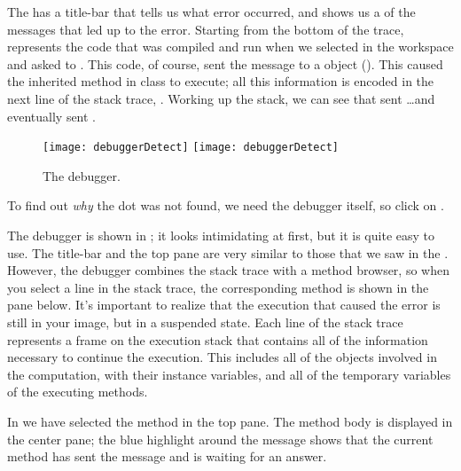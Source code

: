 \documentclass[a4paper,10pt,twoside]{book}
\begin{document}
The  has a title-bar that tells us what error occurred, and shows us a  of the messages that led up to the error. 
Starting from the bottom of the trace,  represents the code that was compiled and run when we selected  in the workspace and asked \sq to .
This code, of course, sent the message  to a  object (). 
This caused the inherited  method in class  to execute; all this information is encoded in the next line of the stack trace, .  
Working up the stack, we can see that  sent \ldots and eventually  sent .

\begin{figure}[btp]
	\begin{center}
	\ifluluelse
		{\texttt{[image: debuggerDetect]}}
		{\texttt{[image: debuggerDetect]}}
	\end{center}
	\caption{The debugger.}
	\label{fig:debuggerDetect}
\end{figure}

To find out \emph{why} the dot was not found, we need the debugger itself, so click on .


The debugger is shown in ; it looks intimidating at first, but it is quite easy to use.
The title-bar and the top pane are very similar to those that we saw in the .  
However, the debugger combines the stack trace with a method browser, so when you select a line in the stack trace, the corresponding method is shown in the pane below.
It's important to realize that the execution that caused the error is still in your image, but in a suspended state.  
Each line of the stack trace represents a frame on the execution stack that contains all of the information necessary to continue the execution.  This includes all of the objects involved in the computation, with their instance variables, and all of the temporary variables of the executing methods.

In  we have selected the  method in the top pane.
The method body is displayed in the center pane; the blue highlight around the message  shows that the current method has sent the message  and is waiting for an answer.
\end{document}
